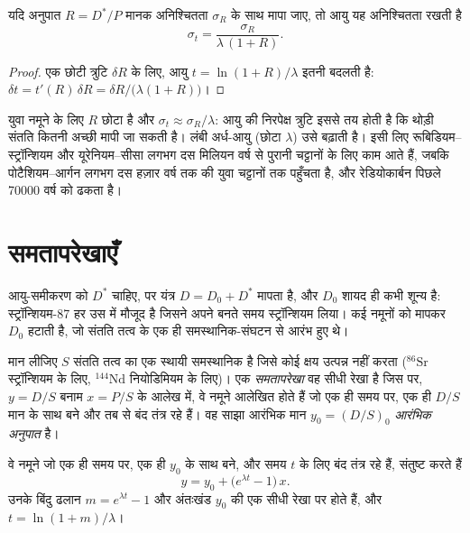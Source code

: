 \begin{proposition}[आयु की सटीकता]\label{prop:b1:radiometric-methods:precision}
यदि अनुपात $R = D^*/P$ मानक अनिश्चितता $\sigma_R$ के साथ मापा जाए, तो आयु यह अनिश्चितता रखती है
\[
  \sigma_t = \frac{\sigma_R}{\lambda\,(1 + R)}.
\]
\end{proposition}

\begin{proof}
एक छोटी त्रुटि $\delta R$ के लिए, आयु $t = \ln(1+R)/\lambda$ इतनी बदलती है: $\delta t = t'(R)\,\delta R = \delta R/\bigl(\lambda(1 + R)\bigr)$।
\end{proof}

युवा नमूने के लिए $R$ छोटा है और $\sigma_t \approx \sigma_R/\lambda$: आयु की निरपेक्ष त्रुटि इससे तय होती है कि थोड़ी संतति कितनी अच्छी मापी जा सकती है। लंबी अर्ध-आयु (छोटा $\lambda$) उसे बढ़ाती है। इसी लिए रूबिडियम–स्ट्रॉन्शियम और यूरेनियम–सीसा लगभग दस मिलियन वर्ष से पुरानी चट्टानों के लिए काम आते हैं, जबकि पोटैशियम–आर्गन लगभग दस हज़ार वर्ष तक की युवा चट्टानों तक पहुँचता है, और रेडियोकार्बन पिछले \num{70000} वर्ष को ढकता है।

\section{समतापरेखाएँ}\label{sec:b1:radiometric-methods:isochrons}

आयु-समीकरण को $D^*$ चाहिए, पर यंत्र $D = D_0 + D^*$ मापता है, और $D_0$ शायद ही कभी शून्य है: स्ट्रॉन्शियम-87 हर उस  में मौजूद है जिसने अपने बनते समय स्ट्रॉन्शियम लिया।  कई नमूनों को मापकर $D_0$ हटाती है, जो संतति तत्व के एक ही समस्थानिक-संघटन से आरंभ हुए थे।

\begin{definition}[समतापरेखा, आरंभिक अनुपात]\label{def:b1:radiometric-methods:isochron}
मान लीजिए $S$ संतति तत्व का एक स्थायी समस्थानिक है जिसे कोई क्षय उत्पन्न नहीं करता ($^{86}\mathrm{Sr}$ स्ट्रॉन्शियम के लिए, $^{144}\mathrm{Nd}$ नियोडिमियम के लिए)। एक \emph{समतापरेखा} वह सीधी रेखा है जिस पर, $y = D/S$ बनाम $x = P/S$ के आलेख में, वे नमूने आलेखित होते हैं जो एक ही समय पर, एक ही $D/S$ मान के साथ बने और तब से बंद तंत्र रहे हैं। वह साझा आरंभिक मान $y_0 = (D/S)_0$ \emph{आरंभिक अनुपात} है।
\end{definition}

\begin{theorem}[समतापरेखा]\label{thm:b1:radiometric-methods:isochron}
वे नमूने जो एक ही समय पर, एक ही  $y_0$ के साथ बने, और समय $t$ के लिए बंद तंत्र रहे हैं, संतुष्ट करते हैं
\[
  y = y_0 + \bigl(e^{\lambda t} - 1\bigr)\,x .
\]
उनके बिंदु ढलान $m = e^{\lambda t} - 1$ और अंतःखंड $y_0$ की एक सीधी रेखा पर होते हैं, और $t = \ln(1+m)/\lambda$।
\end{theorem}

